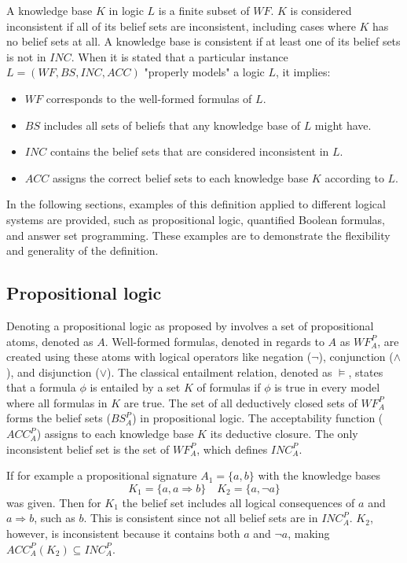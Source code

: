 A knowledge base \(K\) in logic \(L\) is a finite subset of \(WF\).
\(K\) is considered inconsistent if all of its belief sets are inconsistent, including cases where \(K\) has no belief sets at all.
A knowledge base is consistent if at least one of its belief sets is not in \(INC\).
When it is stated that a particular instance \(L = (WF, BS, INC, ACC)\) "properly models" a logic \(L\), it implies:
\begin{itemize}
      \item \(WF\) corresponds to the well-formed formulas of \(L\).
      \item \(BS\) includes all sets of beliefs that any knowledge base of \(L\) might have.
      \item \(INC\) contains the belief sets that are considered inconsistent in \(L\).
      \item \(ACC\) assigns the correct belief sets to each knowledge base \(K\) according to \(L\).
\end{itemize}

In the following sections, examples of this definition applied to different logical systems are provided, such as propositional logic, quantified Boolean formulas, and answer set programming.
These examples are to demonstrate the flexibility and generality of the definition.

\subsection{Propositional logic}
Denoting a propositional logic as proposed by \cite{gelfond_classical_1991} involves a set of propositional atoms, denoted as \(A\).
Well-formed formulas, denoted in regards to \(A\) as \(WF^P_A\), are created using these atoms with logical operators like negation (\(\neg\)), conjunction (\(\land\)), and disjunction (\(\lor\)).
The classical entailment relation, denoted as \(\models\), states that a formula \(\phi\) is entailed by a set \(K\) of formulas if \(\phi\) is true in every model where all formulas in \(K\) are true.
The set of all deductively closed sets of \(WF^P_A\) forms the belief sets (\(BS^P_A\)) in propositional logic.
The acceptability function (\(ACC^P_A\)) assigns to each knowledge base \(K\) its deductive closure.
The only inconsistent belief set is the set of \(WF^P_A\), which defines \(INC^P_A\).

If for example a propositional signature \(A_1 = \{a,b\}\) with the knowledge bases
\[K_1 = \{a, a \Rightarrow b\} \quad K_2 = \{a, \neg a\}\]
was given.
Then for \(K_1\) the belief set includes all logical consequences of \(a\) and \(a \Rightarrow b\), such as \(b\).
This is consistent since not all belief sets are in \(INC^P_A\).
\(K_2\), however, is inconsistent because it contains both \(a\) and \(\neg a\), making \(ACC^P_A(K_2) \subseteq INC^P_A\).

